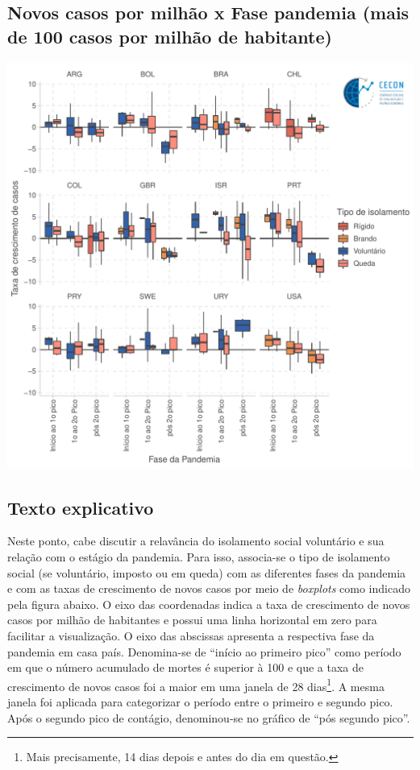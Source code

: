 \documentclass{SelfArx}
\begin{document}
\subsection*{Novos casos por milhão x Fase pandemia (mais de 100 casos por milhão de habitante)}
\label{sec:orga8071f0}

\begin{center}
\includegraphics[width=.9\linewidth]{./figs/COVID/Casos_Policy_100_Todos.pdf}
\end{center}


\subsection*{Texto explicativo}
\label{sec:org8340e0a}

Neste ponto, cabe discutir a relavância do isolamento social voluntário e sua relação com o estágio da pandemia.
Para isso, associa-se o tipo de isolamento social (se voluntário, imposto ou em queda) com as diferentes fases da pandemia e com as taxas de crescimento de novos casos por meio de \emph{boxplots} como indicado pela figura abaixo.
O eixo das coordenadas indica a taxa de crescimento de novos casos por milhão de habitantes e possui uma linha horizontal em zero para facilitar a visualização.
O eixo das abscissas apresenta a respectiva fase da pandemia em casa país.
Denomina-se de ``início ao primeiro pico'' como período em que o número acumulado de mortes é superior à 100 e que a taxa de crescimento de novos casos foi a maior em uma janela de 28 dias\footnote{Mais precisamente, 14 dias depois e antes do dia em questão.}.
A mesma janela foi aplicada para categorizar o período entre o primeiro e segundo pico.
Após o segundo pico de contágio, denominou-se no gráfico de ``pós segundo pico''.
\end{document}
